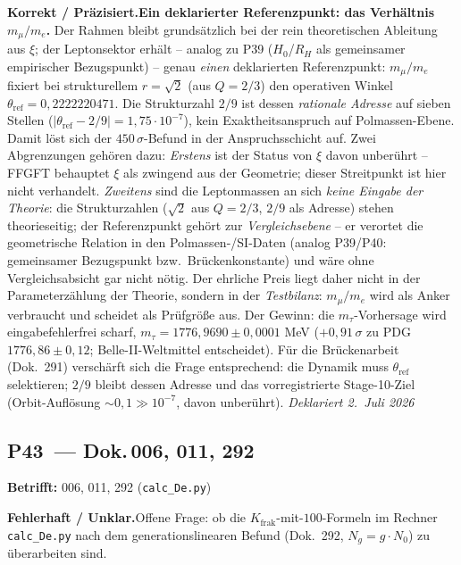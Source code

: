 \smallskip\noindent\textbf{Korrekt / Präzisiert.}\quad \textbf{Ein deklarierter Referenzpunkt: das Verhältnis $m_\mu/m_e$.} Der Rahmen bleibt grundsätzlich bei der rein theoretischen Ableitung aus $\xi$; der Leptonsektor erhält -- analog zu P39 ($H_0$/$R_H$ als gemeinsamer empirischer Bezugspunkt) -- genau \emph{einen} deklarierten Referenzpunkt: $m_\mu/m_e$ fixiert bei strukturellem $r=\sqrt2$ (aus $Q=2/3$) den operativen Winkel $\theta_{\text{ref}}=0{,}2222220471$. Die Strukturzahl $2/9$ ist dessen \emph{rationale Adresse} auf sieben Stellen ($|\theta_{\text{ref}}-2/9|=1{,}75\cdot10^{-7}$), kein Exaktheitsanspruch auf Polmassen-Ebene. Damit löst sich der $450\,\sigma$-Befund in der Anspruchsschicht auf. Zwei Abgrenzungen gehören dazu: \emph{Erstens} ist der Status von $\xi$ davon unberührt -- FFGFT behauptet $\xi$ als zwingend aus der Geometrie; dieser Streitpunkt ist hier nicht verhandelt. \emph{Zweitens} sind die Leptonmassen an sich \emph{keine Eingabe der Theorie}: die Strukturzahlen ($\sqrt2$ aus $Q=2/3$, $2/9$ als Adresse) stehen theorieseitig; der Referenzpunkt gehört zur \emph{Vergleichsebene} -- er verortet die geometrische Relation in den Polmassen-/SI-Daten (analog P39/P40: gemeinsamer Bezugspunkt bzw.\ Brückenkonstante) und wäre ohne Vergleichsabsicht gar nicht nötig. Der ehrliche Preis liegt daher nicht in der Parameterzählung der Theorie, sondern in der \emph{Testbilanz}: $m_\mu/m_e$ wird als Anker verbraucht und scheidet als Prüfgröße aus. Der Gewinn: die $m_\tau$-Vorhersage wird eingabefehlerfrei scharf, $m_\tau = 1776{,}9690 \pm 0{,}0001$ MeV ($+0{,}91\,\sigma$ zu PDG $1776{,}86\pm0{,}12$; Belle-II-Weltmittel entscheidet). Für die Brückenarbeit (Dok.~291) verschärft sich die Frage entsprechend: die Dynamik muss $\theta_{\text{ref}}$ selektieren; $2/9$ bleibt dessen Adresse und das vorregistrierte Stage-10-Ziel (Orbit-Auflösung $\sim0{,}1 \gg 10^{-7}$, davon unberührt). \emph{Deklariert 2.~Juli 2026}


\medskip


\subsection*{P43~--- Dok.\,006, 011, 292}

\noindent\textbf{Betrifft:} 006, 011, 292 (\texttt{calc\_De.py})


\smallskip\noindent\textbf{Fehlerhaft / Unklar.}\quad Offene Frage: ob die $K_{\text{frak}}$-mit-$100$-Formeln im Rechner \texttt{calc\_De.py} nach dem generationslinearen Befund (Dok.~292, $N_g=g\cdot N_0$) zu überarbeiten sind.


